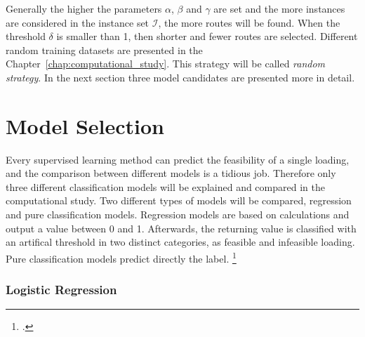 Generally the higher the parameters $\alpha$, $\beta$ and $\gamma$ are set and the more instances
are considered in the instance set $\mathcal{I}$, the more routes will be found. When the threshold $\delta$
is smaller than 1, then shorter and fewer routes are selected. Different
random training datasets are presented in the Chapter~\ref{chap:computational_study}.
This strategy will be called \textit{random strategy}. In the next section three model candidates
are presented more in detail.

\section{Model Selection}
\label{sec:modelselection}
Every supervised learning method can predict the feasibility of a single loading, and the comparison
between different models is a tidious job. Therefore only three different classification
models will be explained and compared in the computational study.
Two different types of models will be compared, regression and pure classification models. Regression
models are based on calculations and output a value between 0 and 1. Afterwards, the returning value is classified with
an artifical threshold in two distinct categories, as feasible and infeasible loading. Pure classification
models predict directly the label. \footcite[cf.][p. 5]{nasteski_overview_2017}

\subsubsection{Logistic Regression}

